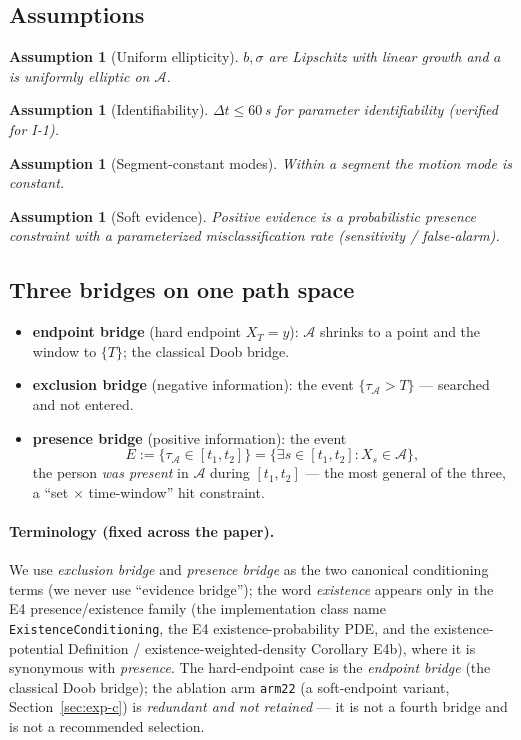 \documentclass[11pt]{article}
\newtheorem{assumption}[theorem]{Assumption}
\newcommand{\Aregion}{\mathcal{A}}
\begin{document}
\subsection{Assumptions}
\begin{assumption}[Uniform ellipticity]\label{ass:a1}
$b,\sigma$ are Lipschitz with linear growth and $a$ is uniformly elliptic on $\Aregion$.
\end{assumption}
\begin{assumption}[Identifiability]\label{ass:a2}
$\Delta t\le 60$\,s for parameter identifiability (verified for I-1).
\end{assumption}
\begin{assumption}[Segment-constant modes]\label{ass:a3}
Within a segment the motion mode is constant.
\end{assumption}
\begin{assumption}[Soft evidence]\label{ass:a4}
Positive evidence is a probabilistic presence constraint with a parameterized
misclassification rate (sensitivity / false-alarm).
\end{assumption}

\subsection{Three bridges on one path space}
\label{sec:threebridge}
\begin{itemize}
\item \textbf{endpoint bridge} (hard endpoint $X_T=y$): $\Aregion$ shrinks to a point and the
window to $\{T\}$; the classical Doob bridge.
\item \textbf{exclusion bridge} (negative information): the event
$\{\tau_{\Aregion}>T\}$ --- searched and not entered.
\item \textbf{presence bridge} (positive information): the event
\begin{equation}
  E:=\{\tau_{\Aregion}\in[t_1,t_2]\}=\{\exists s\in[t_1,t_2]:X_s\in\Aregion\},\label{eq:existevent}
\end{equation}
the person \emph{was present} in $\Aregion$ during $[t_1,t_2]$ --- the most general of the
three, a ``set $\times$ time-window'' hit constraint.
\end{itemize}

\paragraph{Terminology (fixed across the paper).}
We use \emph{exclusion bridge} and \emph{presence bridge} as the two canonical
conditioning terms (we never use ``evidence bridge''); the word \emph{existence} appears
only in the E4 presence/existence family (the implementation class name
\texttt{ExistenceConditioning}, the E4 existence-probability PDE, and the
existence-potential Definition / existence-weighted-density Corollary E4b), where it is
synonymous with \emph{presence}. The
hard-endpoint case is the \emph{endpoint bridge} (the classical Doob bridge); the ablation
arm \texttt{arm22} (a soft-endpoint variant, Section~\ref{sec:exp-c}) is \emph{redundant and
not retained} --- it is not a fourth bridge and is not a recommended selection.
\end{document}

